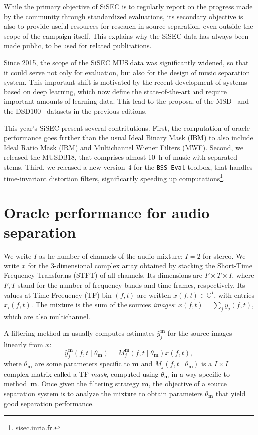 \documentclass{llncs}
\newcommand{\sboxed}[1]{\textbf{#1}}
\newcommand{\thet}[1]{\theta_{\sboxed{#1}}}
\newcommand{\ft}{\left(f,t\right)}
\newcommand{\ftt}[1]{\left(f,t\mid\thet{#1}\right)}
\begin{document}
While the primary objective of SiSEC is to regularly report on the progress made by the community through standardized evaluations, its secondary objective is also to provide useful resources for research in source separation, even outside the scope of the campaign itself. This explains why the SiSEC data has always been made public, to be used for related publications.

Since 2015, the scope of the SiSEC MUS data was significantly widened, so that it could serve not only for evaluation, but also for the design of music separation system. This important shift is motivated by the recent development of systems based on deep learning, which now define the state-of-the-art and require important amounts of learning data. This lead to the proposal of the MSD~\cite{sisec2015} and the DSD100~\cite{sisec2016} datasets in the previous editions.%

This year's SiSEC present several contributions. First, the computation of oracle performance goes further than the usual Ideal Binary Mask (IBM) to also include Ideal Ratio Mask (IRM) and Multichannel Wiener Filters (MWF). Second, we released the MUSDB18, that comprises almost 10~h of music with separated stems. Third, we released a new version~4 for the \texttt{BSS~Eval} toolbox, that handles time-invariant distortion filters, significantly speeding up computations\footnote{\url{sisec.inria.fr}.}.

\section{Oracle performance for audio separation}
\label{sec:oracle}

We write $I$ as he number of channels of the audio mixture: $I=2$ for stereo. We write $x$ for the 3-dimensional complex array obtained by stacking the Short-Time Frequency Transforms (STFT) of all channels. Its dimensions are $F\times T\times I$, where $F,T$ stand for the number of frequency bands and time frames, respectively. Its values at Time-Frequency (TF) bin $\ft$ are  written $x\ft\in\mathbb{C}^I$, with entries $x_i\ft$. The mixture is the sum of the sources \textit{images}: $x\ft=\sum_j y_j\ft$, which are also multichannel.

A filtering method $\sboxed{m}$ usually computes estimates $\hat{y}_j^{\sboxed{m}}$ for the source images linearly from $x$:
\begin{equation}
  \hat{y}_j^{\sboxed{m}}\ftt{m}=M_j^{\sboxed{m}}\ftt{m} x\ft,\label{eq:TFmask}
\end{equation}
where $\thet{m}$ are some parameters specific to $\sboxed{m}$ and $M_j\ftt{m}$ is a $I\times I$ complex matrix called a TF \textit{mask}, computed using $\thet{m}$ in a way specific to method~$\sboxed{m}$. Once given the filtering strategy $\sboxed{m}$, the objective of a source separation system is to analyze the mixture to obtain parameters $\thet{m}$ that yield good separation performance.
\end{document}
